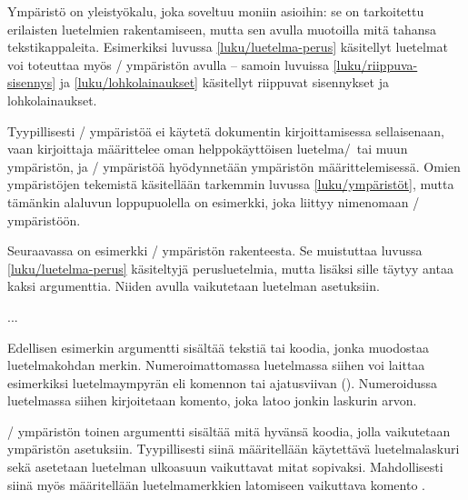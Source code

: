 Ympäristö  on yleistyökalu, joka soveltuu moniin
asioihin: se on tarkoitettu erilaisten luetelmien rakentamiseen, mutta
sen avulla muotoilla mitä tahansa tekstikappaleita. Esimerkiksi luvussa
\ref{luku/luetelma-perus} käsitellyt luetelmat voi toteuttaa myös
\-/ ympäristön avulla -- samoin luvuissa
\ref{luku/riippuva-sisennys} ja \ref{luku/lohkolainaukset} käsitellyt
riippuvat sisennykset ja lohkolainaukset.

Tyypillisesti \-/ ympäristöä ei käytetä dokumentin
kirjoittamisessa sellaisenaan, vaan kirjoittaja määrittelee oman
helppokäyttöisen luetelma\-/\ tai muun ympäristön, ja
\-/ ympäristöä hyödynnetään ympäristön
määrittelemisessä. Omien ympäristöjen tekemistä käsitellään tarkemmin
luvussa \ref{luku/ympäristöt}, mutta tämänkin alaluvun loppupuolella on
esimerkki, joka liittyy nimenomaan \-/ ympäristöön.

Seuraavassa on esimerkki \-/ ympäristön rakenteesta. Se
muistuttaa luvussa \ref{luku/luetelma-perus} käsiteltyjä perusluetelmia,
mutta lisäksi sille täytyy antaa kaksi argumenttia. Niiden avulla
vaikutetaan luetelman asetuksiin.

\begin{koodilohkosis}
\begin{list}{merkki}{asetukset}
\item ...
\end{list}
\end{koodilohkosis}

\noindent
Edellisen esimerkin argumentti  sisältää tekstiä tai
koodia, jonka muodostaa luetelmakohdan merkin. Numeroimattomassa
luetelmassa siihen voi laittaa esimerkiksi luetelmaympyrän eli komennon
 tai ajatusviivan (\koodi{--}). Numeroidussa
luetelmassa siihen kirjoitetaan komento, joka latoo jonkin laskurin
arvon.

\-/ ympäristön toinen argumentti 
sisältää mitä hyvänsä koodia, jolla vaikutetaan ympäristön asetuksiin.
Tyypillisesti siinä määritellään käytettävä luetelmalaskuri sekä
asetetaan luetelman ulkoasuun vaikuttavat mitat sopivaksi. Mahdollisesti
siinä myös määritellään luetelmamerkkien latomiseen vaikuttava komento
.

